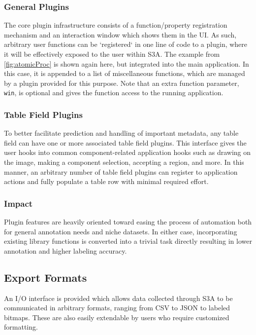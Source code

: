 \subsubsection{General Plugins}
The core plugin infrastructure consists of a function/property registration mechanism and an interaction window which shows them in the UI. As such, arbitrary user functions can be `registered` in one line of code to a plugin, where it will be effectively exposed to the user within S3A. The example from \autoref{fig:atomicProc} is shown again here, but integrated into the main application. In this case, it is appended to a list of miscellaneous functions, which are managed by a plugin provided for this purpose. Note that an extra function parameter, \texttt{win}, is optional and gives the function access to the running application.

\makeCustomMiscFuncFig

\subsubsection{Table Field Plugins}

To better facilitate prediction and handling of important metadata, any table field can have one or more associated table field plugins. This interface gives the user hooks into common component-related application hooks such as drawing on the image, making a component selection, accepting a region, and more. In this manner, an arbitrary number of table field plugins can register to application actions and fully populate a table row with minimal required effort.

\subsubsection{Impact}
Plugin features are heavily oriented toward easing the process of automation both for general annotation needs and niche datasets. In either case, incorporating existing library functions is converted into a trivial task directly resulting in lower annotation and higher labeling accuracy.

\subsection{Export Formats}
An I/O interface is provided which allows data collected through S3A to be communicated in arbitrary formats, ranging from CSV to JSON to labeled bitmaps. These are also easily extendable by users who require customized formatting.

